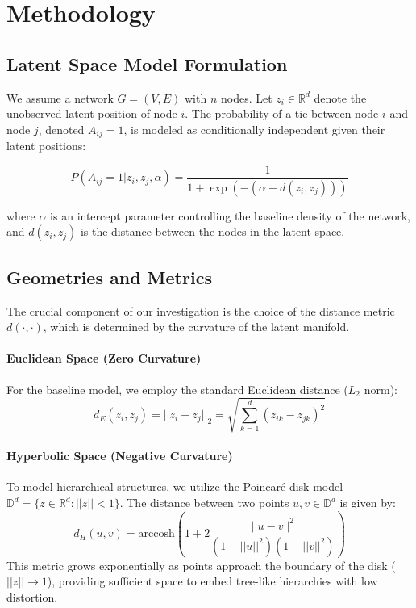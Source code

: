 \section{Methodology}

\subsection{Latent Space Model Formulation}
We assume a network $G=(V, E)$ with $n$ nodes. Let $z_i \in \mathbb{R}^d$ denote the unobserved latent position of node $i$. The probability of a tie between node $i$ and node $j$, denoted $A_{ij}=1$, is modeled as conditionally independent given their latent positions:

\begin{equation}
    P(A_{ij} = 1 | z_i, z_j, \alpha) = \frac{1}{1 + \exp(-(\alpha - d(z_i, z_j)))}
\end{equation}

where $\alpha$ is an intercept parameter controlling the baseline density of the network, and $d(z_i, z_j)$ is the distance between the nodes in the latent space.

\subsection{Geometries and Metrics}
The crucial component of our investigation is the choice of the distance metric $d(\cdot, \cdot)$, which is determined by the curvature of the latent manifold.

\paragraph{Euclidean Space (Zero Curvature)}
For the baseline model, we employ the standard Euclidean distance ($L_2$ norm):
\begin{equation}
    d_E(z_i, z_j) = ||z_i - z_j||_2 = \sqrt{\sum_{k=1}^d (z_{ik} - z_{jk})^2}
\end{equation}

\paragraph{Hyperbolic Space (Negative Curvature)}
To model hierarchical structures, we utilize the Poincaré disk model $\mathbb{D}^d = \{z \in \mathbb{R}^d : ||z|| < 1\}$. The distance between two points $u, v \in \mathbb{D}^d$ is given by:
\begin{equation}
    d_H(u, v) = \text{arccosh}\left( 1 + 2 \frac{||u - v||^2}{(1 - ||u||^2)(1 - ||v||^2)} \right)
\end{equation}
This metric grows exponentially as points approach the boundary of the disk ($||z|| \to 1$), providing sufficient space to embed tree-like hierarchies with low distortion.


